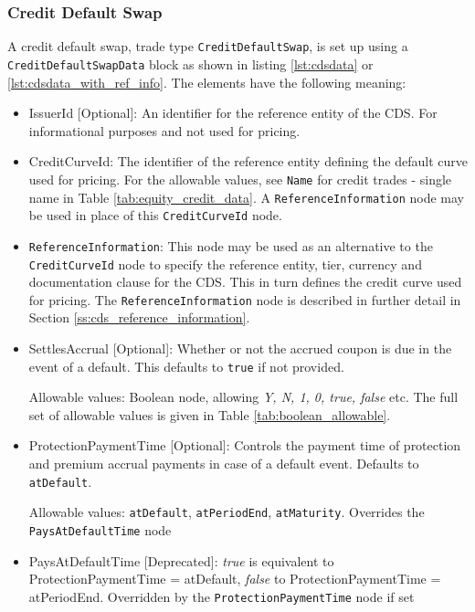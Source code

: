\subsubsection{Credit Default Swap}

A credit default swap, trade type \lstinline!CreditDefaultSwap!, is set up using a \lstinline!CreditDefaultSwapData! block as shown in listing \ref{lst:cdsdata} or \ref{lst:cdsdata_with_ref_info}. The elements have the following meaning:

\begin{itemize}
\item IssuerId [Optional]: An identifier for the reference entity of the CDS. For informational purposes and not used for pricing.
\item CreditCurveId: The identifier of the reference entity defining the default curve used for pricing. For the allowable values, see \lstinline!Name! for credit trades - single name in Table \ref{tab:equity_credit_data}. A \lstinline!ReferenceInformation! node may be used in place of this \lstinline!CreditCurveId! node.
\item \lstinline!ReferenceInformation!: This node may be used as an alternative to the \lstinline!CreditCurveId! node to specify the reference entity, tier, currency and documentation clause for the CDS. This in turn defines the credit curve used for pricing. The \lstinline!ReferenceInformation! node is described in further detail in Section \ref{ss:cds_reference_information}.
\item SettlesAccrual [Optional]: Whether or not the accrued coupon is due in the event of a default. This defaults to \lstinline!true! if not provided.

Allowable values: Boolean node, allowing \emph{Y, N, 1, 0, true, false} etc. The full set of allowable values is given in Table \ref{tab:boolean_allowable}.

\item ProtectionPaymentTime [Optional]: Controls the payment time of protection and premium accrual payments in case of
  a default event. Defaults to \lstinline!atDefault!. 
  
Allowable values: \lstinline!atDefault!, \lstinline!atPeriodEnd!, \lstinline!atMaturity!. Overrides the \lstinline!PaysAtDefaultTime! node
  
\item PaysAtDefaultTime [Deprecated]: \emph{true} is equivalent to ProtectionPaymentTime = atDefault,
  \emph{false} to ProtectionPaymentTime = atPeriodEnd. Overridden by the \lstinline!ProtectionPaymentTime! node if set
  

\end{itemize}
